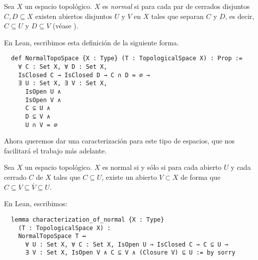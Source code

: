 \begin{definition}
  Sea $X$ un espacio topológico. $X$ es \emph{normal} si para cada par de cerrados disjuntos $C, D \subseteq X$ existen abiertos disjuntos $U$ y $V$ en $X$ tales  que separan $C$ y $D$, es decir, $C \subseteq U$ y $D \subseteq V$ \textnormal{(véase \cite[p. 99]{willard2012general})}.
\end{definition}

En Lean, escribimos esta definición de la siguiente forma.

\begin{lstlisting}
  def NormalTopoSpace {X : Type} (T : TopologicalSpace X) : Prop :=
    ∀ C : Set X, ∀ D : Set X,
    IsClosed C → IsClosed D → C ∩ D = ∅ →
    ∃ U : Set X, ∃ V : Set X,
      IsOpen U ∧
      IsOpen V ∧
      C ⊆ U ∧
      D ⊆ V ∧
      U ∩ V = ∅
\end{lstlisting}

Ahora queremos dar una caracterización para este tipo de espacios, que nos facilitará el trabajo más adelante.

\begin{proposition}
  Sea $X$ un espacio topológico. $X$ es normal si y sólo si para cada abierto $U$ y cada cerrado $C$ de $X$ tales que $C \subseteq U$, existe un abierto $V \subset X$ de forma que $C \subseteq V \subseteq \overline{V} \subseteq U$.
\end{proposition}

En Lean, escribimos:

\begin{lstlisting}
  lemma characterization_of_normal {X : Type}
    (T : TopologicalSpace X) :
    NormalTopoSpace T ↔
      ∀ U : Set X, ∀ C : Set X, IsOpen U → IsClosed C → C ⊆ U →
      ∃ V : Set X, IsOpen V ∧ C ⊆ V ∧ (Closure V) ⊆ U := by sorry
\end{lstlisting}


